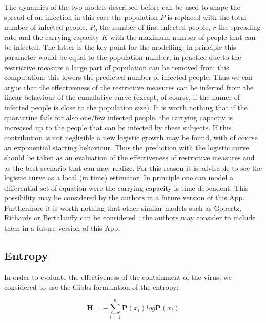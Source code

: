 \documentclass[
12pt, %
a4paper, %
oneside, %
headinclude,footinclude, %
BCOR5mm, %
]{scrartcl}
\begin{document}
The dynamics of the two models described before can be used to shape the spread of an infection \cite{serfling1952historical,ma2014estimating} in this case the population $P$ is replaced with the total number of infected people, $P_{0}$ the number of first infected people, $r$ the spreading rate and the carrying capacity $K$ with the maximum number of people that can be infected. The latter is the key point for the modelling: in principle this parameter would be equal to the population number, in practice due to the restrictive measure a large part of population can be removed from this computation: this lowers the predicted number of infected people. Thus we can argue that the effectiveness of the restrictive measures can be inferred from the linear behaviour of the cumulative curve (except, of course, if the numer of infected people is close to the population size). It is worth nothing that if the quarantine fails for also one/few infected people, the carrying capacity is increased up to the people that can be infected by these subjects. If this contribution is not negligible a new logistic growth may be found, with of course an exponential starting behaviour. Thus the prediction with the logistic curve should be taken as an evaluation of the effectiveness of restrictive measures and as the best scenario that can may realize. For this reason it is advisable to see the logistic curve as a local (in time) estimator. In principle one can model a differential set of equation were the carrying capacity is time dependent. This possibility may be considered  by the authors in a future version of this App. Furthermore it is worth nothing that other similar models such as Gopertz, Richards or Bertalanffy can be considered \cite{ma2014estimating} : the authors may consider to include them in  a future version of this App.


\subsection{Entropy}

In order to evaluate the effectiveness of the containment of the virus, we considered to use the Gibbs formulation of the entropy: 

\begin{equation}
\textbf{H}=-\sum^{n}_{i=1}\textbf{P}(x_{i})log\textbf{P}(x_{i})
\end{equation}
\end{document}
